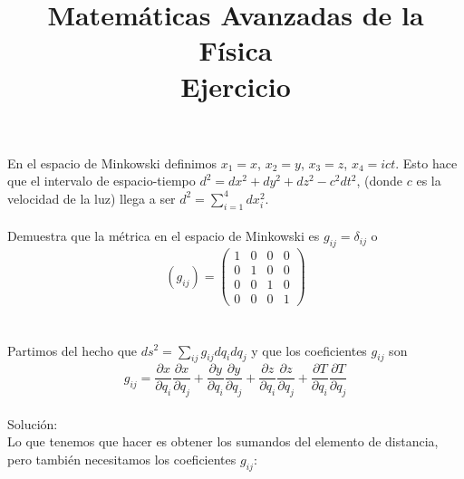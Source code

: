 
\title{Matemáticas Avanzadas de la Física \\ {\large Ejercicio}}
\date{ }

\maketitle
\fontsize{14}{14}\selectfont
En el espacio de Minkowski definimos $x_{1}=x$, $x_{2}=y$, $x_{3}=z$, $x_{4}=ict$. Esto hace que el intervalo de espacio-tiempo $d^{2}= dx^{2}+dy^{2}+dz^{2}-c^{2}dt^{2}$, (donde $c$ es la velocidad de la luz) llega a ser $d^{2} = \sum_{i=1}^{4} dx_{i}^{2}$.
\\
\\
Demuestra que la métrica en el espacio de Minkowski es $g_{ij} = \delta_{ij}$ o
\[ (g_{ij}) = \begin{pmatrix}
1 & 0 & 0 & 0 \\
0 & 1 & 0 & 0 \\
0 & 0 & 1 & 0 \\
0 & 0 & 0 & 1
\end{pmatrix} \]
\\
\\
Partimos del hecho que $ds^{2} = \sum\limits_{ij} g_{ij} dq_{i}dq_{j}$ y que los coeficientes $g_{ij}$ son 
\[ g_{ij} = \dfrac{\partial x}{\partial q_{i}} \dfrac{\partial x}{\partial q_{j}} + \dfrac{\partial y}{\partial q_{i}} \dfrac{\partial y}{\partial q_{j}} + \dfrac{\partial z}{\partial q_{i}} \dfrac{\partial z}{\partial q_{j}} + \dfrac{\partial T}{\partial q_{i}} \dfrac{\partial T}{\partial q_{j}}\]
\\
Solución:
\\
Lo que tenemos que hacer es obtener los sumandos del elemento de distancia, pero también necesitamos los coeficientes $g_{ij}$:
